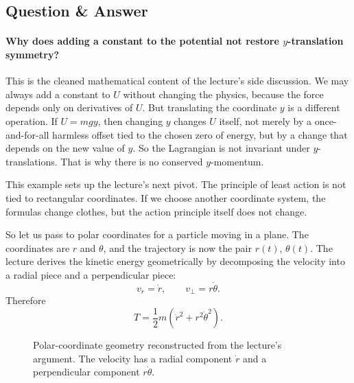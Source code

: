 \subsection{Question \& Answer}

\paragraph{Why does adding a constant to the potential not restore \(y\)-translation symmetry?}
This is the cleaned mathematical content of the lecture's side discussion. We may always add a constant to \(U\) without changing the physics, because the force depends only on derivatives of \(U\). But translating the coordinate \(y\) is a different operation. If \(U=mgy\), then changing \(y\) changes \(U\) itself, not merely by a once-and-for-all harmless offset tied to the chosen zero of energy, but by a change that depends on the new value of \(y\). So the Lagrangian is not invariant under \(y\)-translations. That is why there is no conserved \(y\)-momentum.

This example sets up the lecture's next pivot. The principle of least action is not tied to rectangular coordinates. If we choose another coordinate system, the formulas change clothes, but the action principle itself does not change.

So let us pass to polar coordinates for a particle moving in a plane. The coordinates are \(r\) and \(\theta\), and the trajectory is now the pair \(r(t)\), \(\theta(t)\). The lecture derives the kinetic energy geometrically by decomposing the velocity into a radial piece and a perpendicular piece:
\begin{equation}
v_r=\dot r,
\qquad
v_\perp=r\dot\theta.
\end{equation}
Therefore
\begin{equation}
T=\frac12 m\left(\dot r^2+r^2\dot\theta^2\right).
\end{equation}

\begin{figure}
\centering
{}
\caption{Polar-coordinate geometry reconstructed from the lecture's argument. The velocity has a radial component \(\dot r\) and a perpendicular component \(r\dot\theta\).}
\end{figure}

